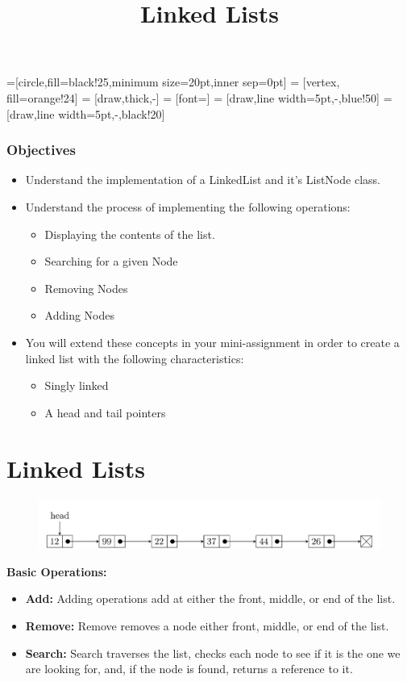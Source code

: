 \documentclass{beamer}
\title{\textbf{Linked Lists}}
\author{\textbf{}}
\institute[\textbf{UIUC}]{\textbf{}}
\date{}
\begin{document}
=[circle,fill=black!25,minimum size=20pt,inner sep=0pt]
 = [vertex, fill=orange!24]
 = [draw,thick,-]
 = [font=\small]
 = [draw,line width=5pt,-,blue!50]
 = [draw,line width=5pt,-,black!20]


\frame{\titlepage}

\begin{frame}
	\frametitle{Objectives}
    \begin{itemize}
        \item Understand the implementation of a LinkedList and it's ListNode class.
        \item Understand the process of implementing the following operations:
            \begin{itemize}
                \item Displaying the contents of the list.
                \item Searching for a given Node
                \item Removing Nodes
                \item Adding Nodes
            \end{itemize}
        \item You will extend these concepts in your mini-assignment in order to create a linked list with the following characteristics:
            \begin{itemize}
                \item Singly linked
                \item A head and tail pointers
            \end{itemize}
    \end{itemize}
\end{frame}

\section{Linked Lists}
\begin{frame}
    \begin{figure}
        \includegraphics[width=\textwidth]{./imgs/linked-list.png}
    \end{figure}
    \vfill
    \textbf{Basic Operations:}\\
    \begin{itemize}
        \item \textbf{Add:} Adding operations add at either the front, middle, or end of the list.
        \item \textbf{Remove:} Remove removes a node either front, middle, or end of the list.
        \item \textbf{Search:} Search traverses the list, checks each node to see if it is the one we are looking for, and, if the node is found, returns a reference to it.
    \end{itemize}
\end{frame}
\end{document}
